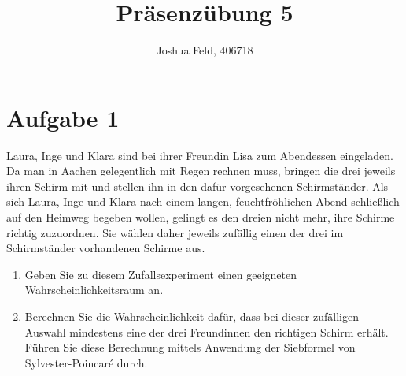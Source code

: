 \documentclass{exercise}
\institute{Institut für Statistik und Wirtschaftsmathematik}
\title{Präsenzübung 5}
\author{Joshua Feld, 406718}
\begin{document}
    \maketitle


    \section*{Aufgabe 1}

    \begin{problem}
        Laura, Inge und Klara sind bei ihrer Freundin Lisa zum Abendessen eingeladen.
        Da man in Aachen gelegentlich mit Regen rechnen muss, bringen die drei jeweils ihren Schirm mit und stellen ihn in den dafür vorgesehenen Schirmständer.
        Als sich Laura, Inge und Klara nach einem langen, feuchtfröhlichen Abend schließlich auf den Heimweg begeben wollen, gelingt es den dreien nicht mehr, ihre Schirme richtig zuzuordnen.
        Sie wählen daher jeweils zufällig einen der drei im Schirmständer vorhandenen Schirme aus.
        \begin{enumerate}
            \item Geben Sie zu diesem Zufallsexperiment einen geeigneten Wahrscheinlichkeitsraum an.
            \item Berechnen Sie die Wahrscheinlichkeit dafür, dass bei dieser zufälligen Auswahl mindestens eine der drei Freundinnen den richtigen Schirm erhält.
            Führen Sie diese Berechnung mittels Anwendung der Siebformel von Sylvester-Poincaré durch.
        \end{enumerate}
    \end{problem}
\end{document}
